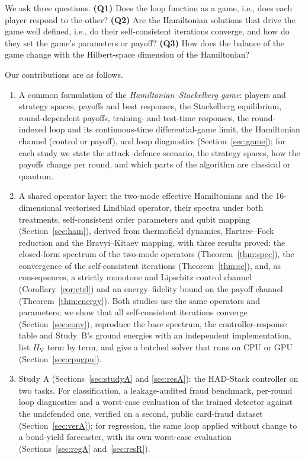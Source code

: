\documentclass[conference]{IEEEtran}
\newcommand{\HV}{H_{\mathrm{V}}}
\begin{document}
We ask three questions. \textbf{(Q1)} Does the loop function as a game, i.e., does each player respond to the other? \textbf{(Q2)} Are the Hamiltonian solutions that drive the game well defined, i.e., do their self-consistent iterations converge, and how do they set the game's parameters or payoff? \textbf{(Q3)} How does the balance of the game change with the Hilbert-space dimension of the Hamiltonian?

Our contributions are as follows.
\begin{enumerate}
\item A common formulation of the \emph{Hamiltonian--Stackelberg game}: players and strategy spaces, payoffs and best responses, the Stackelberg equilibrium, round-dependent payoffs, training- and test-time responses, the round-indexed loop and its continuous-time differential-game limit, the Hamiltonian channel (control or payoff), and loop diagnostics (Section~\ref{sec:game}); for each study we state the attack--defence scenario, the strategy spaces, how the payoffs change per round, and which parts of the algorithm are classical or quantum.
\item A shared operator layer: the two-mode effective Hamiltonians and the 16-dimensional vectorised Lindblad operator, their spectra under both treatments, self-consistent order parameters and qubit mapping (Section~\ref{sec:ham}), derived from thermofield dynamics, Hartree--Fock reduction and the Bravyi--Kitaev mapping, with three results proved: the closed-form spectrum of the two-mode operators (Theorem~\ref{thm:spec}), the convergence of the self-consistent iterations (Theorem~\ref{thm:sc}), and, as consequences, a strictly monotone and Lipschitz control channel (Corollary~\ref{cor:ctrl}) and an energy--fidelity bound on the payoff channel (Theorem~\ref{thm:energy}). Both studies use the same operators and parameters; we show that all self-consistent iterations converge (Section~\ref{sec:conv}), reproduce the base spectrum, the controller-response table and Study~B's ground energies with an independent implementation, list $\HV$ term by term, and give a batched solver that runs on CPU or GPU (Section~\ref{sec:cpugpu}).
\item Study A (Sections~\ref{sec:studyA} and \ref{sec:resA}): the HAD-Stack controller on two tasks. For classification, a leakage-audited fraud benchmark, per-round loop diagnostics and a worst-case evaluation of the trained detector against the undefended one, verified on a second, public card-fraud dataset (Section~\ref{sec:verA}); for regression, the same loop applied without change to a bond-yield forecaster, with its own worst-case evaluation (Sections~\ref{sec:regA} and~\ref{sec:resR}).

\end{enumerate}
\end{document}
